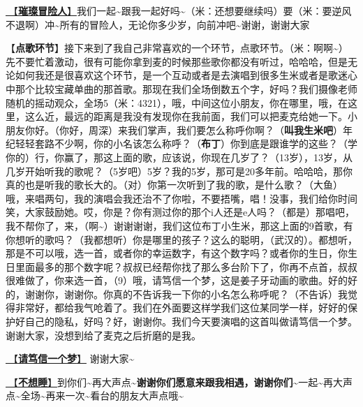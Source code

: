 \documentclass[]{ctexbook}
\begin{document}
\hyperref[adventurers]{🎵【\textbf{璀璨冒险人}】}我们一起\textasciitilde 跟我一起好吗\textasciitilde（米：还想要继续吗）要（米：要逆风不退啊）冲\textasciitilde 所有的冒险人，无论你多少岁，向前冲吧\textasciitilde 谢谢，谢谢大家

【\textbf{点歌环节}】接下来到了我自己非常喜欢的一个环节，点歌环节。（米：啊啊\textasciitilde）先不要忙着激动，很有可能你拿到麦的时候那些歌你都没有听过，哈哈哈，但是无论如何我还是很喜欢这个环节，是一个互动或者是去演唱到很多生米或者是歌迷心中那个比较宝藏单曲的那首歌。那现在我们全场倒数五个字，好吗？我们摄像老师随机的摇动观众，全场5（米：4321），哦，中间这位小朋友，你在哪里，哦，在这里，这么近，最远的距离是我没有发现你在我前面，我们可以把麦克给她一下。小朋友你好。（你好，周深）来我们掌声，我们要怎么称呼你啊？（\textbf{叫我生米吧}）年纪轻轻套路不少啊，你的小名该怎么称呼？（\textbf{布丁}）你到底是跟谁学的这些？（学你的）行，你赢了，那这上面的歌，应该说，你现在几岁了？（13岁），13岁，从几岁开始听我的歌呢？（5岁吧）5岁？我的5岁，那可是20多年前。哈哈哈，那你真的也是听我的歌长大的。（对）你第一次听到了我的歌，是什么歌？（大鱼）哦，来唱两句，我的演唱会我还治不了你啦，不要捂嘴，唱！没事，我们给你时间笑，大家鼓励她。哎，你是？你有测过你的那个i人还是e人吗？（都是）那唱吧，我不帮你了，来，（啊\textasciitilde）谢谢谢谢，我们这位布丁小生米，那这上面的9首歌，有你想听的歌吗？（我都想听）你是哪里的孩子？这么的聪明，（武汉的）。都想听，那是不可以哦，选一首，或者你的幸运数字，有这个数字吗？或者你的生日，你生日里面最多的那个数字呢？叔叔已经帮你找了那么多台阶下了，你再不点首，叔叔很难做了，你来选一首，（9）哦，请笃信一个梦，这是姜子牙动画的歌曲。好的好的，谢谢你，谢谢你。你真的不告诉我一下你的小名怎么称呼呢？（不告诉）我觉得非常好，都给我气呛着了。我们在外面要这样学我们这位某同学一样，好好的保护好自己的隐私，好吗？好，谢谢你。我们今天要演唱的这首叫做请笃信一个梦。谢谢大家，没想到给了麦克之后折磨的是我。

\hyperref[believe-your-dream]{🎵【\textbf{请笃信一个梦}】} 谢谢大家\textasciitilde{}

\hyperref[donot-want-to-sleep]{🎵【\textbf{不想睡}】}到你们\textasciitilde 再大声点\textasciitilde{}\textbf{谢谢你们愿意来跟我相遇，谢谢你们\textasciitilde{}}一起\textasciitilde 再大声点\textasciitilde 全场\textasciitilde 再来一次\textasciitilde 看台的朋友大声点哦\textasciitilde{}
\end{document}
